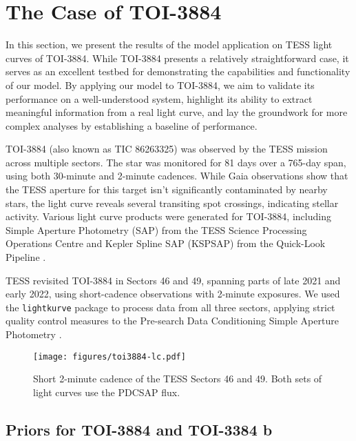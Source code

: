 \documentclass[twocolumn]{aastex631}
\begin{document}
\section{The Case of TOI-3884}
\label{sec:toi3884}
In this section, we present the results of the model application on TESS light curves of TOI-3884. While TOI-3884 presents a relatively straightforward case, 
it serves as an excellent testbed for demonstrating the capabilities and functionality of our model. By applying our model to TOI-3884, we aim to validate 
its performance on a well-understood system, highlight its ability to extract meaningful information from a real light curve, 
and lay the groundwork for more complex analyses by establishing a baseline of performance.

TOI-3884 (also known as TIC 86263325) was observed by the TESS mission across multiple sectors. The star was monitored for 81 days over a 765-day span, 
using both 30-minute and 2-minute cadences. While Gaia observations show that the TESS aperture for this target isn't significantly contaminated by nearby stars, 
the light curve reveals several transiting spot crossings, indicating stellar activity. Various light curve products were generated for TOI-3884, 
including Simple Aperture Photometry (SAP) 
from the TESS Science Processing Operations Centre and Kepler Spline SAP (KSPSAP) from the Quick-Look Pipeline \citep{Huang2020}. 

TESS revisited TOI-3884 in Sectors 46 and 49, spanning parts of late 2021 and early 2022, using short-cadence observations with 2-minute exposures. 
We used the \texttt{lightkurve} package \citep{lightkurve} to process data from all three sectors, applying strict quality control measures to 
the Pre-search Data Conditioning Simple Aperture Photometry \citep{jenkins2016}.

\begin{figure*}[hbt!]
    \begin{centering}
        \texttt{[image: figures/toi3884-lc.pdf]}
        \caption{
            Short 2-minute cadence of the TESS Sectors 46 and 49. 
            Both sets of light curves use the PDCSAP flux.
        }
        \label{fig:toi-3884-pdscap-lc}
    \end{centering}
\end{figure*}

\subsection{Priors for TOI-3884 and TOI-3384 b}
\end{document}
